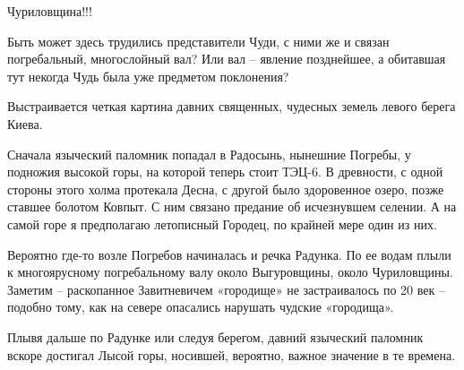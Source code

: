Чуриловщина!!!

Быть может здесь трудились представители Чуди, с ними же и связан погребальный, многослойный вал? Или вал – явление позднейшее, а обитавшая тут некогда Чудь была уже предметом поклонения?

Выстраивается четкая картина давних священных, чудесных земель левого берега Киева.

Сначала языческий паломник попадал в Радосынь, нынешние Погребы, у подножия высокой горы, на которой теперь стоит ТЭЦ-6. В древности, с одной стороны этого холма протекала Десна, с другой было здоровенное озеро, позже ставшее болотом Ковпыт. С ним связано предание об исчезнувшем селении. А на самой горе я предполагаю летописный Городец, по крайней мере один из них.

Вероятно где-то возле Погребов начиналась и речка Радунка. По ее водам плыли к многоярусному погребальному валу около Выгуровщины, около Чуриловщины. Заметим – раскопанное Завитневичем «городище» не застраивалось по 20 век – подобно тому, как на севере опасались нарушать чудские «городища». 

Плывя дальше по Радунке или следуя берегом, давний языческий паломник вскоре достигал Лысой горы, носившей, вероятно, важное значение в те времена.

